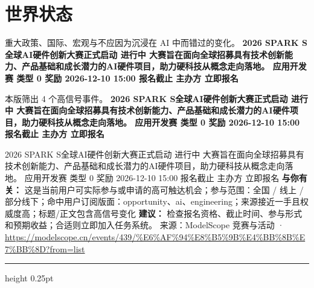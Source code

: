 \documentclass[10.5pt]{ctexart}
\begin{document}
\section*{世界状态}
{\color{ormuted} 重大政策、国际、宏观与不应因为沉浸在 AI 中而错过的变化。}
\vspace{2mm}
{\LARGE\bfseries 2026 SPARK S全球AI硬件创新大赛正式启动 进行中 大赛旨在面向全球招募具有技术创新能力、产品基础和成长潜力的AI硬件项目，助力硬科技从概念走向落地。 应用开发赛 类型 0 奖励 2026-12-10 15:00 报名截止 主办方 立即报名}\par
\vspace{1mm}
{\color{ormuted} 本版筛出 4 个高信号事件。}
\vspace{3mm}
{\Large\bfseries 2026 SPARK S全球AI硬件创新大赛正式启动 进行中 大赛旨在面向全球招募具有技术创新能力、产品基础和成长潜力的AI硬件项目，助力硬科技从概念走向落地。 应用开发赛 类型 0 奖励 2026-12-10 15:00 报名截止 主办方 立即报名}\par
2026 SPARK S全球AI硬件创新大赛正式启动 进行中 大赛旨在面向全球招募具有技术创新能力、产品基础和成长潜力的AI硬件项目，助力硬科技从概念走向落地。 应用开发赛 类型 0 奖励 2026-12-10 15:00 报名截止 主办方 立即报名
\textbf{与你有关：} 这是当前用户可实际参与或申请的高可触达机会；参与范围：全国 / 线上 / 部分线下；命中用户订阅版面：opportunity、ai、engineering；来源接近一手且权威度高；标题/正文包含高信号变化
\textbf{建议：} 检查报名资格、截止时间、参与形式和预期收益；合适则立即加入任务系统。
{\footnotesize\color{ormuted} 来源：ModelScope 竞赛与活动 · \url{https://modelscope.cn/events/439/%E6%AF%94%E8%B5%9B%E4%BB%8B%E7%BB%8D?from=list}}
\vspace{4mm}
\hrule height 0.25pt
\vspace{3mm}
\end{document}
